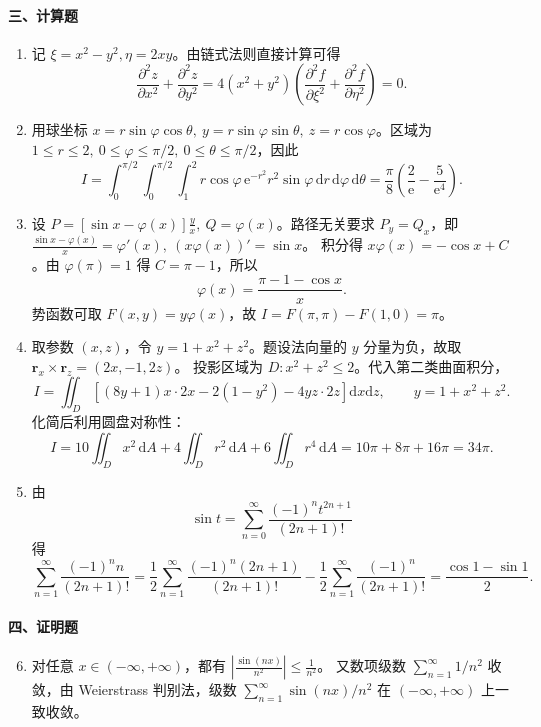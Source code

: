 \paragraph*{三、计算题}
\begin{enumerate}
  \item 记 \(\xi=x^2-y^2,\eta=2xy\)。由链式法则直接计算可得
  \[
    \frac{\partial^2 z}{\partial x^2}+\frac{\partial^2 z}{\partial y^2}
    =4(x^2+y^2)\left(\frac{\partial^2 f}{\partial \xi^2}+\frac{\partial^2 f}{\partial \eta^2}\right)=0.
  \]

  \item 用球坐标
  \(x=r\sin\varphi\cos\theta,\ y=r\sin\varphi\sin\theta,\ z=r\cos\varphi\)。区域为
  \(1\le r\le 2,\ 0\le\varphi\le\pi/2,\ 0\le\theta\le\pi/2\)，因此
  \[
    I=\int_0^{\pi/2}\!\!\int_0^{\pi/2}\!\!\int_1^2
    r\cos\varphi\,\mathrm{e}^{-r^2}r^2\sin\varphi\,\mathrm{d}r\,\mathrm{d}\varphi\,\mathrm{d}\theta
    =\frac{\pi}{8}\left(\frac2{\mathrm{e}}-\frac5{\mathrm{e}^4}\right).
  \]

  \item 设 \(\displaystyle P=\left[\sin x-\varphi(x)\right]\frac{y}{x},\ Q=\varphi(x)\)。路径无关要求 \(P_y=Q_x\)，即 \(\displaystyle \frac{\sin x-\varphi(x)}{x}=\varphi'(x),\ (x\varphi(x))'=\sin x\)。
  积分得 \(x\varphi(x)=-\cos x+C\)。由 \(\varphi(\pi)=1\) 得 \(C=\pi-1\)，所以
  \[
    \varphi(x)=\frac{\pi-1-\cos x}{x}.
  \]
  势函数可取 \(F(x,y)=y\varphi(x)\)，故
  \(\displaystyle I=F(\pi,\pi)-F(1,0)=\pi\)。

  \item 取参数 \((x,z)\)，令 \(y=1+x^2+z^2\)。题设法向量的 \(y\) 分量为负，故取 \(\displaystyle \mathbf r_x\times\mathbf r_z=(2x,-1,2z)\)。
  投影区域为 \(D:x^2+z^2\le 2\)。代入第二类曲面积分，
  \[
    I=\iint_D\left[(8y+1)x\cdot2x-2(1-y^2)-4yz\cdot2z\right]\mathrm{d}x\mathrm{d}z,
    \qquad y=1+x^2+z^2.
  \]
  化简后利用圆盘对称性：
  \[
    I=10\iint_Dx^2\,\mathrm{d}A+4\iint_Dr^2\,\mathrm{d}A+6\iint_Dr^4\,\mathrm{d}A
    =10\pi+8\pi+16\pi=34\pi.
  \]

  \item 由
  \[
    \sin t=\sum_{n=0}^{\infty}\frac{(-1)^n t^{2n+1}}{(2n+1)!}
  \]
  得
  \[
    \sum_{n=1}^{\infty}\frac{(-1)^n n}{(2n+1)!}
    =\frac12\sum_{n=1}^{\infty}\frac{(-1)^n(2n+1)}{(2n+1)!}
     -\frac12\sum_{n=1}^{\infty}\frac{(-1)^n}{(2n+1)!}
    =\frac{\cos1-\sin1}{2}.
  \]
\end{enumerate}

\paragraph*{四、证明题}
\begin{enumerate}
  \setcounter{enumi}{5}
  \item 对任意 \(x\in(-\infty,+\infty)\)，都有 \(\displaystyle \left|\frac{\sin(nx)}{n^2}\right|\le \frac1{n^2}\)。
  又数项级数 \(\sum_{n=1}^{\infty}1/n^2\) 收敛，由 Weierstrass 判别法，级数
  \(\sum_{n=1}^{\infty}\sin(nx)/n^2\) 在 \((-\infty,+\infty)\) 上一致收敛。
\end{enumerate}

